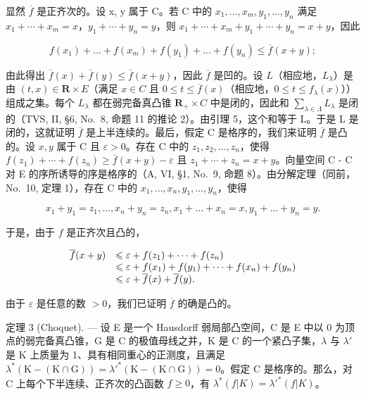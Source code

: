 显然 \(\overline{f}\) 是正齐次的。设 x, y 属于 C。若 C 中的 \(x_{1}, \ldots, x_{m}, y_{1}, \ldots, y_{n}\) 满足 \(x_{1} + \cdots + x_{m} = x\)，\(y_{1} + \cdots + y_{n} = y\)，则 \(x_{1} + \cdots + x_{m} + y_{1} + \cdots + y_{n} = x + y\)，因此

\[
f (x _ {1}) + \dots + f (x _ {m}) + f (y _ {1}) + \dots + f (y _ {n}) \leqslant \overline {{f}} (x + y);
\]

由此得出 \(\overline{f}(x) + \overline{f}(y) \leqslant \overline{f}(x + y)\)，因此 \(\overline{f}\) 是凹的。设 \(L\)（相应地，\(L_{\lambda}\)）是由 \((t, x) \in \mathbf{R} \times E\)（满足 \(x \in C\) 且 \(0 \leqslant t \leqslant \overline{f}(x)\)（相应地，\(0 \leqslant t \leqslant f_{\lambda}(x)\)））组成之集。每个 \(L_{\lambda}\) 都在弱完备真凸锥 \(\mathbf{R}_{+} \times C\) 中是闭的，因此和 \(\sum_{\lambda \in \Lambda} L_{\lambda}\) 是闭的（TVS, II, §6, No.~8, 命题 11 的推论 2）。由引理 5，这个和等于 L。于是 L 是闭的，这就证明 \(\overline{f}\) 是上半连续的。最后，假定 C 是格序的，我们来证明 \(\overline{f}\) 是凸的。设 \(x, y\) 属于 C 且 \(\varepsilon > 0\)。存在 C 中的 \(z_1, z_2, \ldots, z_n\)，使得 \(f(z_1) + \cdots + f(z_n) \geqslant \overline{f}(x + y) - \varepsilon\) 且 \(z_1 + \cdots + z_n = x + y\)。向量空间 C - C 对 E 的序所诱导的序是格序的（A, VI, §1, No.~9, 命题 8）。由分解定理（同前，No.~10, 定理 1），存在 C 中的 \(x_1, \ldots, x_n, y_1, \ldots, y_n\)，使得

\[
x _ {1} + y _ {1} = z _ {1}, \dots , x _ {n} + y _ {n} = z _ {n}, x _ {1} + \dots + x _ {n} = x, y _ {1} + \dots + y _ {n} = y.
\]

于是，由于 \(f\) 是正齐次且凸的，

\[
\begin{array}{r l} \overline {{f}} (x + y) & \leqslant \varepsilon + f (z _ {1}) + \dots + f (z _ {n}) \\ & \leqslant \varepsilon + f (x _ {1}) + f (y _ {1}) + \dots + f (x _ {n}) + f (y _ {n}) \\ & \leqslant \varepsilon + \overline {{f}} (x) + \overline {{f}} (y). \end{array}
\]

由于 \(\varepsilon\) 是任意的数 \(>0\)，我们已证明 \(\overline{f}\) 的确是凸的。

定理 3 (Choquet). --- 设 E 是一个 Hausdorff 弱局部凸空间，C 是 E 中以 0 为顶点的弱完备真凸锥，G 是 C 的极值母线之并，K 是 C 的一个紧凸子集，\(\lambda\) 与 \(\lambda'\) 是 K 上质量为 1、具有相同重心的正测度，且满足 \(\lambda^{*}(\mathrm{K} - (\mathrm{K} \cap \mathrm{G})) = \lambda'^{*}(\mathrm{K} - (\mathrm{K} \cap \mathrm{G})) = 0\)。假定 C 是格序的。那么，对 C 上每个下半连续、正齐次的凸函数 \(f \geqslant 0\)，有 \(\lambda^{*}(f|K) = \lambda'^{*}(f|K)\)。

